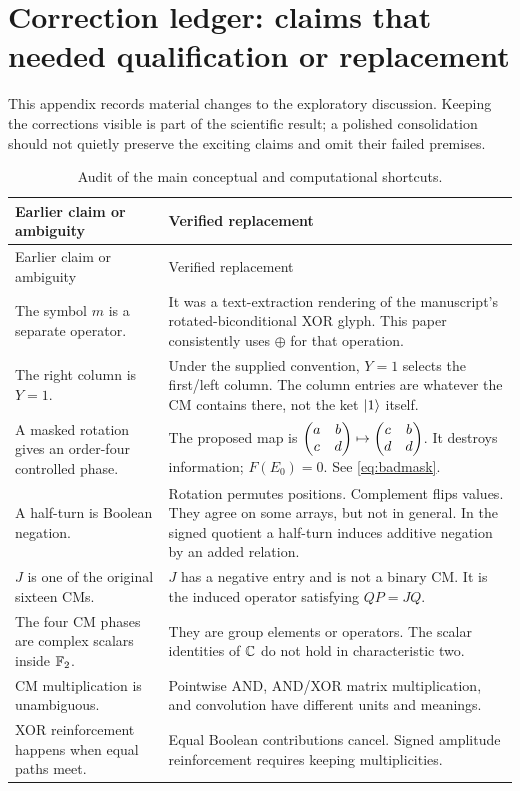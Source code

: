 \appendix
\section{Correction ledger: claims that needed qualification or replacement}\label{app:audit}
This appendix records material changes to the exploratory discussion. Keeping the corrections visible is part of the scientific result; a polished consolidation should not quietly preserve the exciting claims and omit their failed premises.

\begingroup\small
\begin{longtable}{@{}L{0.31\textwidth}L{0.62\textwidth}@{}}
\caption{Audit of the main conceptual and computational shortcuts.}\\
\toprule
Earlier claim or ambiguity & Verified replacement\\
\midrule\endfirsthead
\toprule Earlier claim or ambiguity & Verified replacement\\\midrule\endhead
The symbol $m$ is a separate operator. & It was a text-extraction rendering of the manuscript's rotated-biconditional XOR glyph. This paper consistently uses $\oplus$ for that operation.\\
The right column is $Y=1$. & Under the supplied convention, $Y=1$ selects the first/left column. The column entries are whatever the CM contains there, not the ket $\lvert 1\rangle$ itself.\\
A masked rotation gives an order-four controlled phase. & The proposed map is $\begin{pmatrix}a&b\\c&d\end{pmatrix}\mapsto\begin{pmatrix}c&b\\d&d\end{pmatrix}$. It destroys information; $F(E_0)=0$. See \cref{eq:badmask}.\\
A half-turn is Boolean negation. & Rotation permutes positions. Complement flips values. They agree on some arrays, but not in general. In the signed quotient a half-turn induces additive negation by an added relation.\\
$J$ is one of the original sixteen CMs. & $J$ has a negative entry and is not a binary CM. It is the induced operator satisfying $QP=JQ$.\\
The four CM phases are complex scalars inside $\mathbb F_2$. & They are group elements or operators. The scalar identities of $\mathbb C$ do not hold in characteristic two.\\
CM multiplication is unambiguous. & Pointwise AND, AND/XOR matrix multiplication, and convolution have different units and meanings.\\
XOR reinforcement happens when equal paths meet. & Equal Boolean contributions cancel. Signed amplitude reinforcement requires keeping multiplicities.\\

\end{longtable}
